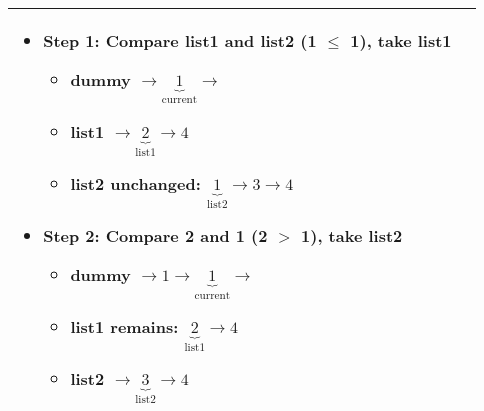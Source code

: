 \begin{summary}
\begin{center}
\begin{tabular}{ll}
{\begin{itemize}
\begin{itemize}
\begin{itemize}
                            \item \textbf{Step 1: Compare list1 and list2 (1 $\leq$ 1), take list1}
                            
                            \begin{itemize}
                                \item dummy $\rightarrow \underbrace{1}_{\text{current}} \rightarrow$
                                \item list1 $\rightarrow \underbrace{2}_{\text{list1}} \rightarrow 4$
                                \item list2 unchanged: $\underbrace{1}_{\text{list2}} \rightarrow 3 \rightarrow 4$
                            \end{itemize}
                        
                            \item \textbf{Step 2: Compare 2 and 1 (2 $>$ 1), take list2}
                            
                            \begin{itemize}
                                \item dummy $\rightarrow 1 \rightarrow \underbrace{1}_{\text{current}} \rightarrow$
                                \item list1 remains: $\underbrace{2}_{\text{list1}} \rightarrow 4$
                                \item list2 $\rightarrow \underbrace{3}_{\text{list2}} \rightarrow 4$
                            \end{itemize}
                        \end{itemize}
                        \end{itemize}                        
                    \end{itemize}                    
                } \\
            \bottomrule
        \end{tabular}
    \end{center}
\end{summary}
\newpage

